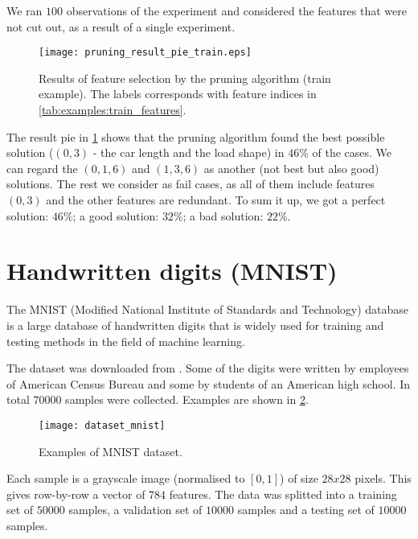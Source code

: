 We ran $ 100 $ observations of the experiment and considered the features that were not cut out, as a result of a single experiment.

\begin{figure}[H]
\centering
\texttt{[image: pruning\_result\_pie\_train.eps]}
\caption{Results of feature selection by the pruning algorithm (train example). The labels corresponds with feature indices in \cref{tab:examples:train_features}.}
\label{fig:examples:pruning_result_pie_train}
\end{figure}

The result pie in \cref{fig:examples:pruning_result_pie_train} shows that the pruning algorithm found the best possible solution ($ (0, 3) $ - the car length and the load shape) in $ 46\% $ of the cases. We can regard the $ (0, 1, 6) $ and $ (1, 3, 6) $ as another (not best but also good) solutions. The rest we consider as fail cases, as all of them include features $ (0, 3) $ and the other features are redundant. To sum it up, we got a perfect solution: $ 46\% $; a good solution: $ 32\% $; a bad solution: $ 22\% $.

\section{Handwritten digits (MNIST)} \label{sec:example_mnist}
The MNIST (Modified National Institute of Standards and Technology) database \citep{wiki:mnist} is a large database of handwritten digits that is widely used for training and testing methods in the field of machine learning. 

The dataset was downloaded from \citep{online:mnist}. Some of the digits were written by employees of American Census Bureau \citep{online:census} and some by students of an American high school. In total $ 70000 $ samples were collected. Examples are shown in \cref{fig:examples:dataset_mnist}.

\begin{figure}[H]
\centering
\texttt{[image: dataset\_mnist]}
\caption{Examples of MNIST dataset.}
\label{fig:examples:dataset_mnist}
\end{figure}

Each sample is a grayscale image (normalised to $ [0, 1] $) of size $ 28x28 $ pixels. This gives row-by-row a vector of $ 784 $ features. The data was splitted into a training set of $ 50000 $ samples, a validation set of $ 10000 $ samples and a testing set of $ 10000 $ samples.

